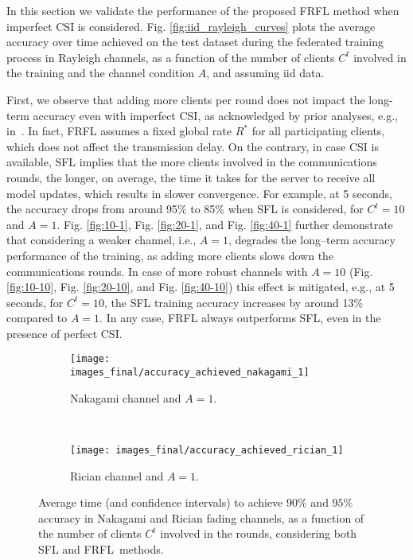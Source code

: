 \documentclass[10pt, conference, letterpaper]{IEEEtran}
\begin{document}
	In this section we validate the performance of the proposed FRFL method when imperfect CSI is considered.
	Fig. \ref{fig:iid_rayleigh_curves} plots the average accuracy over time achieved on the test dataset during the federated training process in Rayleigh channels, as a function of the number of clients $C^t$ involved in the training and the channel condition $A$, and assuming \gls{iid} data.
	
	First, we observe that adding more clients per round does not impact the long-term accuracy even with imperfect CSI, as acknowledged by prior analyses, e.g., in~\cite{MMAmiri2021}. In fact, FRFL assumes a fixed global rate $R^*$ for all participating clients, which does not affect the transmission delay.
	On the contrary, in case CSI is available, SFL implies that the more clients involved in the communications rounds, the longer, on average, the time it takes for the server to receive all model updates, which results in slower convergence.
	For example, at 5 seconds, the accuracy drops from around 95\% to 85\% when SFL is considered, for $C^t =10$ and $A=1$.
	Fig. \ref{fig:10-1}, Fig. \ref{fig:20-1}, and Fig. \ref{fig:40-1} further demonstrate that considering a weaker channel, i.e., $A=1$, degrades the long–term accuracy performance of the training, as adding more clients slows down the communications rounds.
	In case of more robust channels with $A=10$ (Fig. \ref{fig:10-10}, Fig. \ref{fig:20-10}, and Fig. \ref{fig:40-10}) this effect is mitigated, e.g., at 5 seconds, for  $C^t =10$, the SFL training accuracy increases by around 13\% compared to $A=1$. In any case, FRFL always outperforms SFL, even in the presence of perfect CSI.
	
	
	\begin{figure}[t!]
		\centering
		\begin{subfigure}{0.45\textwidth}
			\centering
			\texttt{[image: images\_final/accuracy\_achieved\_nakagami\_1]}
			\caption{Nakagami channel and $A = 1$.}
			\label{fig:nakagami_accuracy}
		\end{subfigure}\\[5pt]
		\begin{subfigure}{0.45\textwidth}
			\centering
			\texttt{[image: images\_final/accuracy\_achieved\_rician\_1]}  
			\caption{Rician channel and $A = 1$.}
			\label{fig:rician_accuracy}
		\end{subfigure}
		\caption{Average time (and confidence intervals) to achieve $90\%$ and $95\%$ accuracy in Nakagami and Rician fading channels, as a function of the number of clients $C^t$ involved in the rounds, considering both SFL and FRFL~methods.\vspace{-0.33cm}}
		\label{fig:others_accuracy}
	\end{figure}
	
\end{document}
